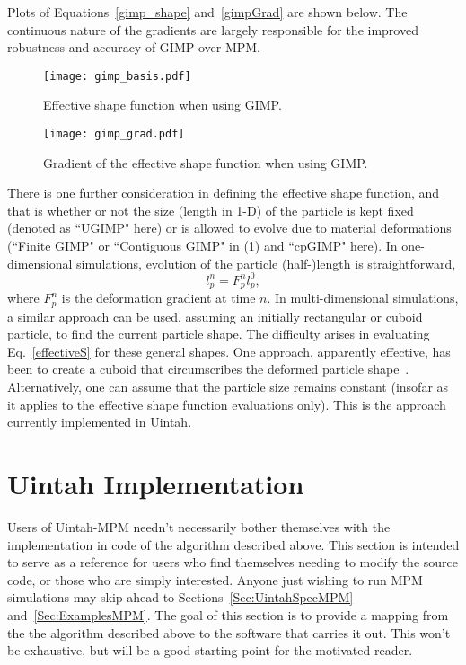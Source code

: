 Plots of Equations~\ref{gimp_shape} and~\ref{gimpGrad} are shown
below.  The continuous nature of the gradients are largely responsible
for the improved robustness and accuracy of GIMP over MPM.

\begin{figure}
  \texttt{[image: gimp\_basis.pdf]}
  \caption{Effective shape function when using GIMP.}
  \label{Fig:GIMP}
\end{figure}

\begin{figure}
  \texttt{[image: gimp\_grad.pdf]}
  \caption{Gradient of the effective shape function when using GIMP.}
  \label{Fig:GradGIMP}
\end{figure}
%
There is one further consideration in defining the effective shape function,
and that is whether or not the size (length in 1-D) of the particle is kept
fixed (denoted as ``UGIMP" here)
or is allowed to evolve due to material deformations 
(``Finite GIMP" or ``Contiguous GIMP" in (1) and ``cpGIMP" here).
In one-dimensional
simulations, evolution of the particle (half-)length is straightforward,
\begin{equation}
l_p^n = F_p^n l_p^0 ,  \label{particle_length}
\end{equation} 
where $F_p^n$ is the deformation gradient at time $n$.
In multi-dimensional simulations, a similar approach can be used, assuming
an initially rectangular or cuboid particle, to find the current particle
shape.  The difficulty arises in evaluating Eq.~\ref{effectiveS} for
these general shapes.  One approach, apparently effective, has been to create
a cuboid that circumscribes the deformed particle shape~\cite{jinmaCMES2006}.
Alternatively, one can assume that the particle size remains constant (insofar
as it applies to the effective shape function evaluations only).  This is
the approach currently implemented in Uintah.

\section{Uintah Implementation} \label{Sec:UintahImp}

Users of Uintah-MPM needn't necessarily bother themselves with the
implementation in code of the algorithm described above.  This section
is intended to serve as a reference for users who find themselves needing
to modify the source code, or those who are simply interested.  Anyone
just wishing to run MPM simulations may skip ahead to
Sections~\ref{Sec:UintahSpecMPM} and~\ref{Sec:ExamplesMPM}.  The goal of
this section is to provide a mapping from the the algorithm described above
to the software that carries it out.  This won't be exhaustive, but will be a
good starting point for the motivated reader.

